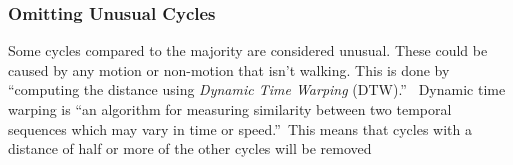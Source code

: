 \documentclass{sig-alternate}
\begin{document}
\subsubsection{Omitting Unusual Cycles}
Some cycles compared to the majority are considered unusual. These could be caused by any motion or non-motion that isn't walking. This is done by ``computing the distance using \textit{Dynamic Time Warping} (DTW).''~\cite{Muaaz:2013} Dynamic time warping is ``an algorithm for measuring similarity between two temporal sequences which may vary in time or speed.''~\cite{wiki2:2014}This means that cycles with a distance of half or more of the other cycles will be removed
\end{document}

